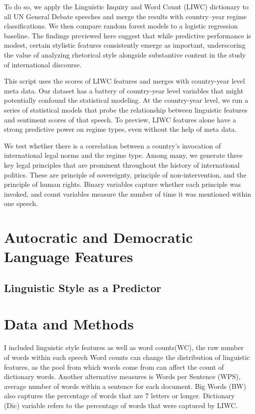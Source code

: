 \documentclass[12pt]{article}
\begin{document}
To do so, we apply the Linguistic Inquiry and Word Count (LIWC) dictionary to all UN General Debate speeches and merge the results with country–year regime classifications. We then compare random forest models to a logistic regression baseline. The findings previewed here suggest that while predictive performance is modest, certain stylistic features consistently emerge as important, underscoring the value of analyzing rhetorical style alongside substantive content in the study of international discourse.

This script uses the scores of LIWC features and merges with country-year level meta data. Our dataset has a battery of country-year level variables that might potentially confound the statistical modeling. At the country-year level, we run a series of statistical models that probe the relationship between linguistic features and sentiment scores of that speech. To preview, LIWC features alone have a strong predictive power on regime types, even without the help of meta data. 

We test whether there is a correlation between a country's invocation of international legal norms and the regime type. Among many, we generate three key legal principles that are prominent throughout the history of international politics. These are principle of sovereignty, principle of non-intervention, and the principle of human rights. Binary variables capture whether each principle was invoked, and count variables measure the number of time it was mentioned within one speech.  

\section{Autocratic and Democratic Language Features}

\subsection{Linguistic Style as a Predictor}


\section{Data and Methods}

I included linguistic style features as well as word counts(WC), the raw number of words within each speech Word counts can change the distribution of linguistic features, as the pool from which words come from can affect the count of dictionary words. Another alternative measures is Words per Sentence (WPS), average number of words within a sentence for each document. Big Words (BW) also captures the percentage of words that are 7 letters or longer. Dictionary (Dic) variable refers to the percentage of words that were captured by LIWC.
\end{document}

